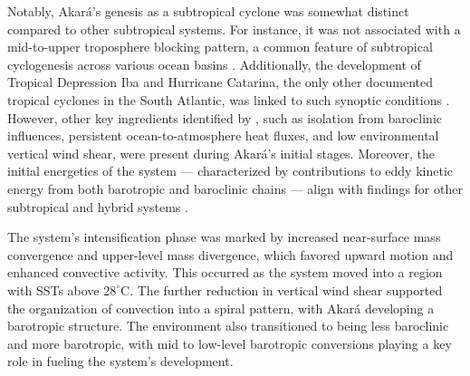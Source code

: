 \documentclass[pdflatex,sn-chicago]{sn-jnl}%
\theoremstyle{plain}
\theoremstyle{definition}
\theoremstyle{remark}
\theoremstyle{definition}
\begin{document}
Notably, Akará's genesis as a subtropical cyclone was somewhat distinct compared to other subtropical systems. For instance, it was not associated with a mid-to-upper troposphere blocking pattern, a common feature of subtropical cyclogenesis across various ocean basins \citep{da2019subtropical}. Additionally, the development of Tropical Depression Iba and Hurricane Catarina, the only other documented tropical cyclones in the South Atlantic, was linked to such synoptic conditions \citep{pezza2005first,reboita2021iba}. However, other key ingredients identified by \citet{da2019subtropical}, such as isolation from baroclinic influences, persistent ocean-to-atmosphere heat fluxes, and low environmental vertical wind shear, were present during Akará's initial stages. Moreover, the initial energetics of the system — characterized by contributions to eddy kinetic energy from both barotropic and baroclinic chains — align with findings for other subtropical and hybrid systems \citep{michaelides1987limited,dias2013synoptic,pezza2014large,cavicchia2018energetics}.

The system's intensification phase was marked by increased near-surface mass convergence and upper-level mass divergence, which favored upward motion and enhanced convective activity. This occurred as the system moved into a region with SSTs above $28^{\circ}\text{C}$. The further reduction in vertical wind shear supported the organization of convection into a spiral pattern, with Akará developing a barotropic structure. The environment also transitioned to being less baroclinic and more barotropic, with mid to low-level barotropic conversions playing a key role in fueling the system's development.
\end{document}
